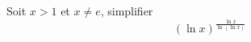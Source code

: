 Soit $x>1$ et $x\neq e$, simplifier
\begin{displaymath}
  (\ln x)^{\frac{\ln x}{\ln(\ln x)}}
\end{displaymath}
\bigskip
